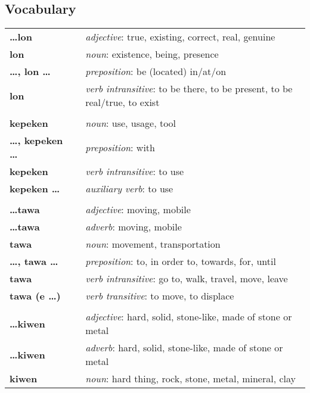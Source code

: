 \subsection*{Vocabulary}
\begin{supertabular}{p{2,5cm}|ll}
\textbf{\dots lon} && \textit{adjective}: true, existing, correct, real, genuine \\ %
\textbf{lon} && \textit{noun}: existence, being, presence \\ %
\textbf{\dots , lon \dots} && \textit{preposition}: be (located) in/at/on \\ %
\textbf{lon} && \textit{verb intransitive}: to be there, to be present, to be real/true, to exist \\ %
 && \\ %
\textbf{kepeken} && \textit{noun}: use, usage, tool \\ %
\textbf{\dots , kepeken \dots} && \textit{preposition}: with \\ %
\textbf{kepeken} && \textit{verb intransitive}: to use \\ %
\textbf{kepeken \dots} && \textit{auxiliary verb}: to use \\ %
 && \\ %
\textbf{\dots tawa} && \textit{adjective}: moving, mobile \\ %
\textbf{\dots tawa} && \textit{adverb}: moving, mobile \\ %
\textbf{tawa} && \textit{noun}: movement, transportation \\ %
\textbf{\dots , tawa \dots} && \textit{preposition}: to, in order to, towards, for, until \\ %
\textbf{tawa} && \textit{verb intransitive}: go to, walk, travel, move, leave \\ %
\textbf{tawa (e \dots)} && \textit{verb transitive}: to move, to displace \\ %
 && \\ %
\textbf{\dots kiwen} && \textit{adjective}: hard, solid, stone-like, made of stone or metal \\ %
\textbf{\dots kiwen} && \textit{adverb}: hard, solid, stone-like, made of stone or metal \\ %
\textbf{kiwen} && \textit{noun}: hard thing, rock, stone, metal, mineral, clay \\ %

\end{supertabular}
